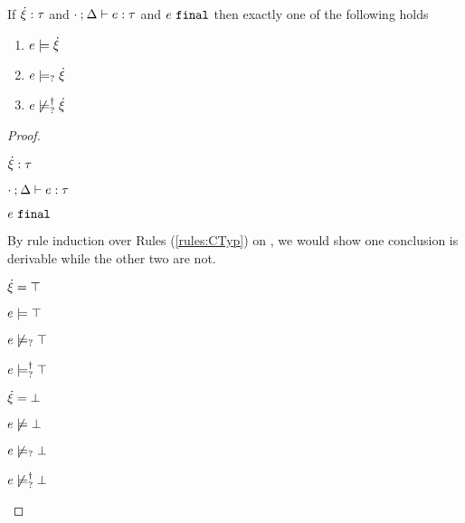 \begin{theorem}
  \label{thrm:exclusive-constraint-satisfaction}
  If $\dot{\xi} : \tau$ and $\cdot \mathbin{;} \Delta \vdash e : \tau$ and $e ~\mathtt{final}$ then exactly one of the following holds
  \begin{enumerate}
    \item $e \models \dot{\xi}$
    \item $e \models_{?} \dot{\xi}$
    \item $e \not\models_{?}^{\dag} \dot{\xi}$
  \end{enumerate}
\end{theorem}
\begin{proof}
\begin{pfsteps*}
\item $\dot{\xi} : \tau$  
\item $\cdot \mathbin{;} \Delta \vdash e : \tau$  
\item $e ~\mathtt{final}$  
\end{pfsteps*}
By rule induction over Rules (\ref{rules:CTyp}) on , we would show one conclusion is derivable while the other two are not.
\begin{byCases}

\item[\text{(\ref{rule:CTTruth})}]
    \begin{pfsteps*}
    \item $\dot{\xi}=\top$ 
    \item $e \models \top$  
    \item $e \not\models_{?} \top$ 
    \item $e \models_{?}^{\dag} \top$ 
    \end{pfsteps*}
    
\item[\text{(\ref{rule:CTFalsity})}]
    \begin{pfsteps*}
    \item $\dot{\xi}=\bot$ 
    \item $e \not\models \bot$  
    \item $e \not\models_{?} \bot$  
    \item $e \not\models_{?}^{\dag} \bot$ 
    \end{pfsteps*}
    

\end{byCases}
\end{proof}
